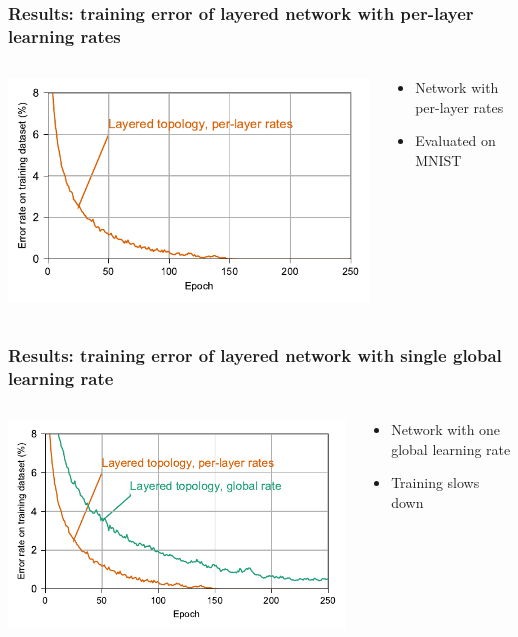 \documentclass[pdf]{beamer}
\begin{document}
\begin{frame}
	\frametitle{Results: training error of layered network with per-layer learning rates}
	\begin{columns}
	\begin{column}{.6\textwidth}
		\includegraphics[width=\textwidth]{figures/performance_original.pdf}
	\end{column}
	\begin{column}{.4\textwidth}
	\begin{itemize}
		\item Network with per-layer rates
		\item Evaluated on MNIST
	\end{itemize}
	\end{column}
	\end{columns}
\end{frame}
\begin{frame}
	\frametitle{Results: training error of layered network with single global learning rate}
	\begin{columns}
	\begin{column}{.6\textwidth}
		\includegraphics[width=\textwidth]{figures/performance_original+global.pdf}
	\end{column}
	\begin{column}{.4\textwidth}
	\begin{itemize}
		\item Network with one global learning rate
		\item Training slows down
	\end{itemize}
	\end{column}
	\end{columns}
\end{frame}
\end{document}
